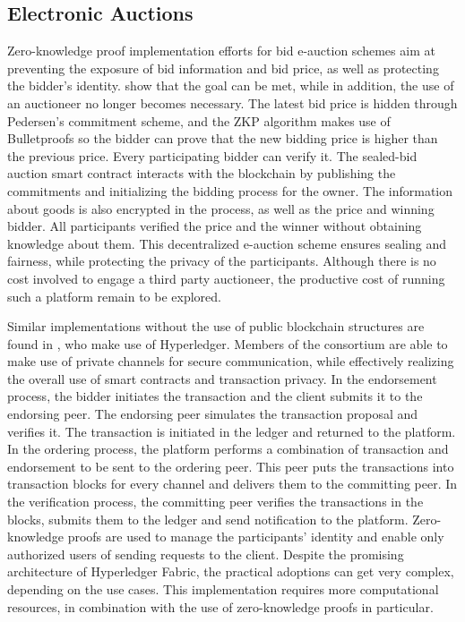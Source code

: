 \subsection{Electronic Auctions}
Zero-knowledge proof implementation efforts for bid e-auction schemes aim at preventing the exposure of bid information and bid price, as well as protecting the bidder's identity. \citet{LiXue} show that the goal can be met, while in addition, the use of an auctioneer no longer becomes necessary. The latest bid price is hidden through Pedersen's commitment scheme, and the ZKP algorithm makes use of Bulletproofs so the bidder can prove that the new bidding price is higher than the previous price. Every participating bidder can verify it. The sealed-bid auction smart contract interacts with the blockchain by publishing the commitments and initializing the bidding process for the owner. The information about goods is also encrypted in the process, as well as the price and winning bidder. All participants verified the price and the winner without obtaining knowledge about them. This decentralized e-auction scheme ensures sealing and fairness, while protecting the privacy of the participants. Although there is no cost involved to engage a third party auctioneer, the productive cost of running such a platform remain to be explored.

Similar implementations without the use of public blockchain structures are found in \citet{WangZhaoMu}, who make use of Hyperledger. Members of the consortium are able to make use of private channels for secure communication, while effectively realizing the overall use of smart contracts and transaction privacy. In the endorsement process, the bidder initiates the transaction and the client submits it to the endorsing peer. The endorsing peer simulates the transaction proposal and verifies it. The transaction is initiated in the ledger and returned to the platform. In the ordering process, the platform performs a combination of transaction and endorsement to be sent to the ordering peer. This peer puts the transactions into transaction blocks for every channel and delivers them to the committing peer. In the verification process, the committing peer verifies the transactions in the blocks, submits them to the ledger and send notification to the platform. Zero-knowledge proofs are used to manage the participants' identity and enable only authorized users of sending requests to the client. Despite the promising architecture of Hyperledger Fabric, the practical adoptions can get very complex, depending on the use cases. This implementation requires more computational resources, in combination with the use of zero-knowledge proofs in particular.

